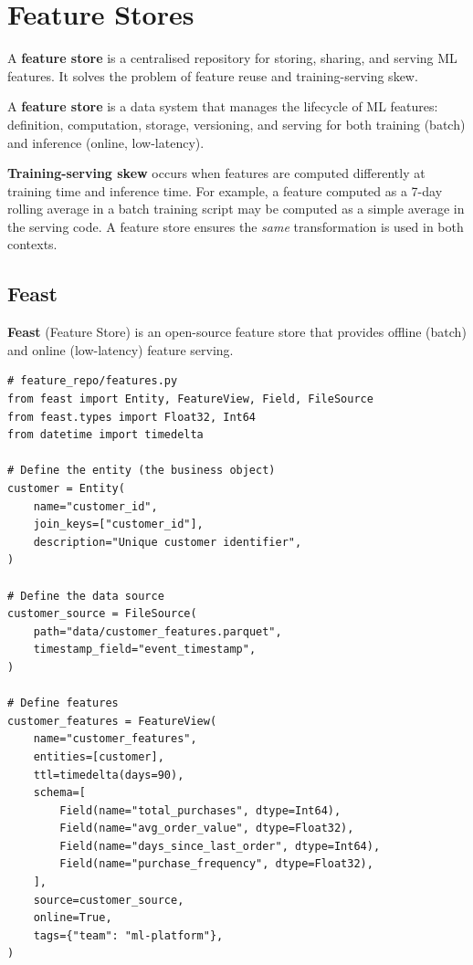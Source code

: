 \section{Feature Stores}
\label{sec:feature-stores}

A \textbf{feature store} is a centralised repository
for storing, sharing, and serving ML features. It solves the problem of
feature reuse and training-serving skew.

\begin{definition}
A \textbf{feature store} is a data system that manages the lifecycle of
ML features: definition, computation, storage, versioning, and serving
for both training (batch) and inference (online, low-latency).
\end{definition}

\begin{warning}[title=\textbf{Training-serving skew}]
\textbf{Training-serving skew} occurs when
features are computed differently at training time and inference time.
For example, a feature computed as a 7-day rolling average in a batch
training script may be computed as a simple average in the serving code.
A feature store ensures the \emph{same} transformation is used in both
contexts.
\end{warning}

\subsection{Feast}

\textbf{Feast} (Feature Store) is an open-source feature
store that provides offline (batch) and online (low-latency) feature
serving.

\begin{codeblock}[title=\textbf{Feast feature definitions}]
\begin{verbatim}
# feature_repo/features.py
from feast import Entity, FeatureView, Field, FileSource
from feast.types import Float32, Int64
from datetime import timedelta

# Define the entity (the business object)
customer = Entity(
    name="customer_id",
    join_keys=["customer_id"],
    description="Unique customer identifier",
)

# Define the data source
customer_source = FileSource(
    path="data/customer_features.parquet",
    timestamp_field="event_timestamp",
)

# Define features
customer_features = FeatureView(
    name="customer_features",
    entities=[customer],
    ttl=timedelta(days=90),
    schema=[
        Field(name="total_purchases", dtype=Int64),
        Field(name="avg_order_value", dtype=Float32),
        Field(name="days_since_last_order", dtype=Int64),
        Field(name="purchase_frequency", dtype=Float32),
    ],
    source=customer_source,
    online=True,
    tags={"team": "ml-platform"},
)
\end{verbatim}
\end{codeblock}

